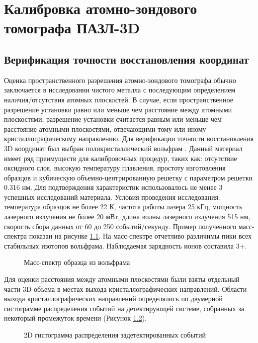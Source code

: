 \chapter{Калибровка атомно-зондового томографа ПАЗЛ-3D}\label{ch:ch3}

\section{Верификация точности восстановления координат}\label{sec:ch3/sect1}

Оценка пространственного разрешения атомно-зондового томографа обычно заключается в исследовании чистого металла с последующим определением наличия/отсутствия атомных плоскостей. В случае, если пространственное разрешение установки равно или меньше чем расстояние между атомными плоскостями, разрешение установки считается равным или меньше чем расстояние атомными плоскостями, отвечающими тому или иному кристаллографическому направлению. Для верификации точности восстановления 3D координат был выбран поликристаллический вольфрам \cite{scbibAPPLE}. Данный материал имеет ряд преимуществ для калибровочных процедур, таких как: отсутствие оксидного слоя, высокую температуру плавления, простоту изготовления образцов и кубическую объемно-центрированную решетку с параметром решетки 0.316 нм. Для подтверждения характеристик использовалось не менее 3 успешных исследований материала. Условия проведения исследования: температура образцов не более 22 К, частота работы лазера 25 кГц, мощность лазерного излучения не более 20 мВт, длина волны лазерного излучения 515 нм, скорость сбора данных от 60 до 250 событий/секунду. Пример полученного масс-спектра показан на рисунке \cref{fig:W_massspectr}. На масс-спектре отчетливо различимы пики всех стабильных изотопов вольфрама. Наблюдаемая зарядность ионов составила 3+. 

\begin{figure}[htb]
	\caption{Масс-спектр образца из вольфрама}
	\label{fig:W_massspectr}
\end{figure}

Для оценки расстояния между атомными плоскостями были взяты отдельный части 3D объема в местах выхода кристаллографических направлений. Области выхода кристаллографических направлений определялись по двумерной гистограмме распределения событий на детектирующей системе, собранных за некоторый промежуток времени (Рисунок \cref{fig:W_3D}).

\begin{figure}[htb]
	\centerfloat{
		\texttt{[image: W\_3D]}
	}
	\caption{2D гистограмма распределения задетектированных событий}
	\label{fig:W_3D}
\end{figure}

